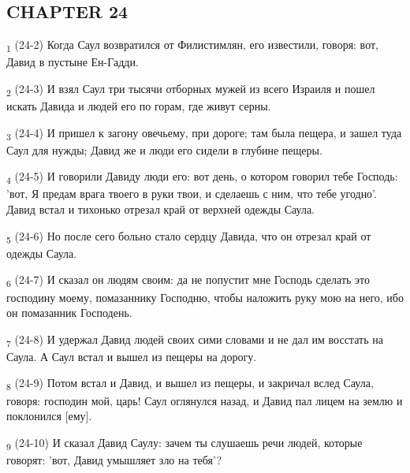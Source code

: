 \subsection{CHAPTER 24}
\begin{tcolorbox}
\textsubscript{1} (24-2) Когда Саул возвратился от Филистимлян, его известили, говоря: вот, Давид в пустыне Ен-Гадди.
\end{tcolorbox}
\begin{tcolorbox}
\textsubscript{2} (24-3) И взял Саул три тысячи отборных мужей из всего Израиля и пошел искать Давида и людей его по горам, где живут серны.
\end{tcolorbox}
\begin{tcolorbox}
\textsubscript{3} (24-4) И пришел к загону овечьему, при дороге; там была пещера, и зашел туда Саул для нужды; Давид же и люди его сидели в глубине пещеры.
\end{tcolorbox}
\begin{tcolorbox}
\textsubscript{4} (24-5) И говорили Давиду люди его: вот день, о котором говорил тебе Господь: 'вот, Я предам врага твоего в руки твои, и сделаешь с ним, что тебе угодно'. Давид встал и тихонько отрезал край от верхней одежды Саула.
\end{tcolorbox}
\begin{tcolorbox}
\textsubscript{5} (24-6) Но после сего больно стало сердцу Давида, что он отрезал край от одежды Саула.
\end{tcolorbox}
\begin{tcolorbox}
\textsubscript{6} (24-7) И сказал он людям своим: да не попустит мне Господь сделать это господину моему, помазаннику Господню, чтобы наложить руку мою на него, ибо он помазанник Господень.
\end{tcolorbox}
\begin{tcolorbox}
\textsubscript{7} (24-8) И удержал Давид людей своих сими словами и не дал им восстать на Саула. А Саул встал и вышел из пещеры на дорогу.
\end{tcolorbox}
\begin{tcolorbox}
\textsubscript{8} (24-9) Потом встал и Давид, и вышел из пещеры, и закричал вслед Саула, говоря: господин мой, царь! Саул оглянулся назад, и Давид пал лицем на землю и поклонился [ему].
\end{tcolorbox}
\begin{tcolorbox}
\textsubscript{9} (24-10) И сказал Давид Саулу: зачем ты слушаешь речи людей, которые говорят: 'вот, Давид умышляет зло на тебя'?
\end{tcolorbox}
